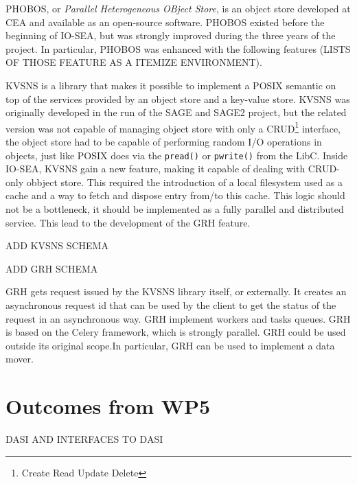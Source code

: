 PHOBOS, or \textit{Parallel Heterogeneous OBject Store}, is an object store developed at CEA and available as an
open-source software. PHOBOS existed before the beginning of IO-SEA, but was strongly improved during the three
years of the project. In particular, PHOBOS was enhanced with the following features (LISTS OF THOSE FEATURE
AS A ITEMIZE ENVIRONMENT). 

KVSNS is a library that makes it possible to implement a POSIX semantic on top of the services provided by an
object store and a key-value store. KVSNS was originally developed in the run of the SAGE and SAGE2 project, but
the related version was not capable of managing object store with only a CRUD\footnote{Create Read Update Delete}
interface, the object store had to be capable of performing random I/O operations in objects, just like POSIX
does via the \verb|pread()| or \verb|pwrite()| from the LibC. Inside IO-SEA, KVSNS gain a new feature, making it
capable of dealing with CRUD-only obbject store. This required the introduction of a local filesystem used as
a cache and a way to fetch and dispose entry from/to this cache. This logic should not be a bottleneck, it should
be implemented as a fully parallel and distributed service. This lead to the development of the GRH feature.

ADD KVSNS SCHEMA

ADD GRH SCHEMA

GRH gets request issued by the KVSNS library itself, or externally. It creates an asynchronous request id that
can be used by the client to get the status of the request in an asynchronous way. GRH implement workers and 
tasks queues. GRH is based on the Celery framework, which is strongly parallel. GRH could be used outside its
original scope.In particular, GRH can be used to implement a data mover. 


\section{Outcomes from WP5}

DASI AND INTERFACES TO DASI



